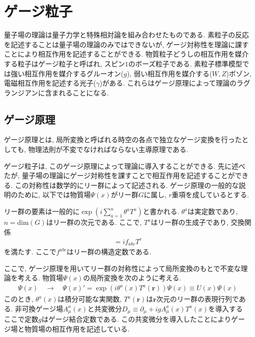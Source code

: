 \section{ゲージ粒子}
量子場の理論は量子力学と特殊相対論を組み合わせたものである.
素粒子の反応を記述することは量子場の理論のみではできないが, ゲージ対称性を理論に課すことにより相互作用を記述することができる.
物質粒子どうしの相互作用を媒介する粒子はゲージ粒子と呼ばれ, スピン$1$のボーズ粒子である.
素粒子標準模型では強い相互作用を媒介するグルーオン($g$), 弱い相互作用を媒介する($W, Z$)ボゾン, 電磁相互作用を記述する光子($\gamma$)がある.
これらはゲージ原理によって理論のラグランジアンに含まれることになる.
\subsection{ゲージ原理}
ゲージ原理とは, 局所変換と呼ばれる時空の各点で独立なゲージ変換を行ったとしても, 物理法則が不変でなければならない主導原理である.

ゲージ粒子は, このゲージ原理によって理論に導入することができる.
先に述べたが, 量子場の理論にゲージ対称性を課すことで相互作用を記述することができる.
この対称性は数学的にリー群によって記述される.
ゲージ原理の一般的な説明のために, 以下では物質場$\Psi(x)$がリー群$G$に属し, $r$重項を成しているとする.

リー群の要素は一般的に$\exp\left(i\sum_{a=1}^n \theta^a T^a\right)$と書かれる.
$\theta^a$は実定数であり, $n=\mathrm{dim}(G)$はリー群の次元である.
ここで, $T^a$はリー群の生成子であり, 交換関係
\begin{align}
  [T^a, T^b] = if_{abc}T^c \label{gauge-1}
\end{align}
を満たす.
ここで$f^{abc}$はリー群の構造定数である.

ここで, ゲージ原理を用いてリー群の対称性によって局所変換のもとで不変な理論を考える.
物質場$\Psi(x)$の局所変換を次のように考える.
\begin{align}
  \Psi(x)\quad\rightarrow\quad\Psi(x)' = \exp\left(i\theta^a(x)T^a(\bm{r})\right)\Psi(x) \equiv U(x)\Psi(x) \label{gauge-2}
\end{align}
このとき, $\theta^a(x)$は積分可能な実関数, $T^a(\bm{r})$は$\bm{r}$次元のリー群の表現行列である.
非可換ゲージ場$A^a_\mu(x)$と共変微分$D_\mu\equiv\partial_\mu+ig A^a_\mu(x)T^a(x)$を導入する
ここで定数$g$はゲージ結合定数である.
この共変微分を導入したことによりゲージ場と物質場の相互作用を記述している.

